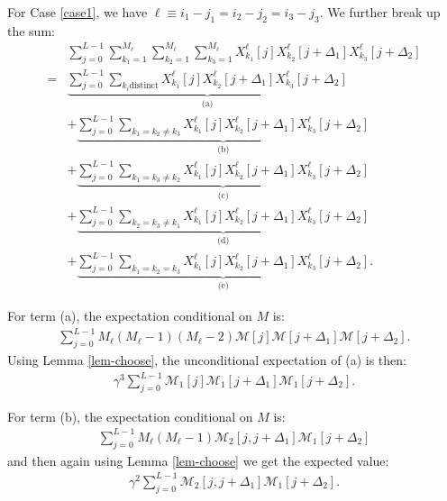 \documentclass{article}
\theoremstyle{thm}
\theoremstyle{definition}
\newcommand{\1}{\mathbf{1}}
\newcommand{\M}{\mathcal{M}}
\begin{document}
For Case \ref{case1}, we have $\ell \equiv i_1 - j_1 = i_2 - j_2 = i_3 - j_3$. We further break up the sum:
%
\begin{align}
%
&\sum_{j=0}^{L-1} \sum_{k_1=1}^{M_\ell} \sum_{k_2=1}^{M_\ell} \sum_{k_3=1}^{M_\ell} 
    X_{k_1}^{\ell}[j] X_{k_2}^{\ell}[j + \Delta_1] X_{k_3}^{\ell}[j + \Delta_2]
    \nonumber \\
=& \underbrace{ \sum_{j=0}^{L-1} \sum_{k_i \text{distinct}} 
    X_{k_1}^{\ell}[j] X_{k_2}^{\ell}[j + \Delta_1] X_{k_3}^{\ell}[j + \Delta_2]
        }_{\text{(a)}}
    \nonumber \\
&+\underbrace{ \sum_{j=0}^{L-1} \sum_{k_1=k_2\ne k_3} 
    X_{k_1}^{\ell}[j] X_{k_2}^{\ell}[j + \Delta_1] X_{k_3}^{\ell}[j + \Delta_2]
        }_{\text{(b)}}
    \nonumber \\
&+\underbrace{ \sum_{j=0}^{L-1} \sum_{k_1=k_3\ne k_2} 
    X_{k_1}^{\ell}[j] X_{k_2}^{\ell}[j + \Delta_1] X_{k_3}^{\ell}[j + \Delta_2]
        }_{\text{(c)}}
    \nonumber \\
&+\underbrace{ \sum_{j=0}^{L-1} \sum_{k_2=k_3\ne k_1} 
    X_{k_1}^{\ell}[j] X_{k_2}^{\ell}[j + \Delta_1] X_{k_3}^{\ell}[j + \Delta_2]
        }_{\text{(d)}}
    \nonumber \\
&+\underbrace{ \sum_{j=0}^{L-1} \sum_{k_1=k_2=k_3} 
    X_{k_1}^{\ell}[j] X_{k_2}^{\ell}[j + \Delta_1] X_{k_3}^{\ell}[j + \Delta_2]
        }_{\text{(e)}}.
%
\end{align}

For term (a), the expectation conditional on $M$ is:
%
\begin{align}
%
\sum_{j=0}^{L-1} M_\ell(M_\ell-1)(M_\ell-2)\M[j] \M[j+\Delta_1] \M[j+\Delta_2].
%
\end{align}
%
Using Lemma \ref{lem-choose}, the unconditional expectation of (a) is then:
%
\begin{align} \label{aaaa}
%
\gamma^3 \sum_{j=0}^{L-1} \M_1[j] \M_1[j+\Delta_1] \M_1[j+\Delta_2].
%
\end{align}


For term (b), the expectation conditional on $M$ is:
%
\begin{align}
%
\sum_{j=0}^{L-1} M_\ell (M_\ell - 1) \M_2[j,j+\Delta_1] \M_1[j + \Delta_2]
%
\end{align}
%
and then again using Lemma \ref{lem-choose} we get the expected value:
%
\begin{align} \label{bbbb}
%
\gamma^2 \sum_{j=0}^{L-1} \M_2[j,j+\Delta_1] \M_1[j+\Delta_2].
%
\end{align}
\end{document}
